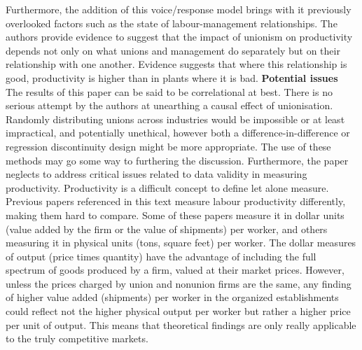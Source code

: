 \documentclass[10pt]{article}
\newcommand{\bb}{\bigbreak\noindent}
\begin{document}
\begin{spacing}{1.5}
	
	\bb\bb
	Furthermore, the addition of this voice/response model brings with it previously overlooked factors such as the state of labour-management relationships. The authors provide evidence to suggest that the impact of unionism on productivity depends not only on what unions and management do separately but on their relationship with one another. Evidence suggests that where this relationship is good, productivity is higher than in plants where it is bad.
	\bb
	\textbf{Potential issues}\\
	The results of this paper can be said to be correlational at best. There is no serious attempt by the authors at unearthing a causal effect of unionisation. Randomly distributing unions across industries would be impossible or at least impractical, and potentially unethical, however both a difference-in-difference or regression discontinuity design might be more appropriate. The use of these methods may go some way to furthering the discussion. 
	\bb
	Furthermore, the paper neglects to address critical issues related to data validity in measuring productivity. Productivity is a difficult concept to define let alone measure. Previous papers referenced in this text measure labour productivity differently, making them hard to compare. Some of these papers measure it in dollar units (value added by the firm or the value of shipments) per worker, and others measuring it in physical units (tons, square feet) per worker. The dollar measures of output (price times quantity) have the advantage of including the full spectrum of goods produced by a firm, valued at their market prices. However, unless the prices charged by union and nonunion firms are the same, any finding of higher value added (shipments) per worker in the organized establishments could reflect not the higher physical output per worker but rather a higher price per unit of output. This means that theoretical findings are only really applicable to the truly competitive markets. 
	

\end{spacing}
\end{document}
